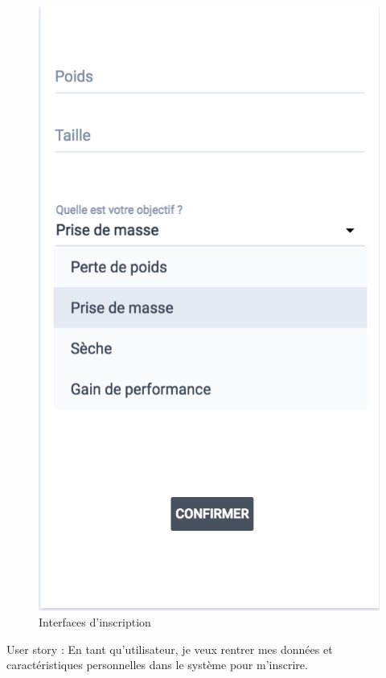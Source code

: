 \begin{figure}[!h]
\includegraphics[scale=0.3]{ihms/caracteristiques}
\caption{Interfaces d'inscription}
\end{figure}


\begin{itshape}
User story : En tant qu'utilisateur, je veux rentrer mes données et caractéristiques personnelles dans le système pour m'inscrire.
\end{itshape}

